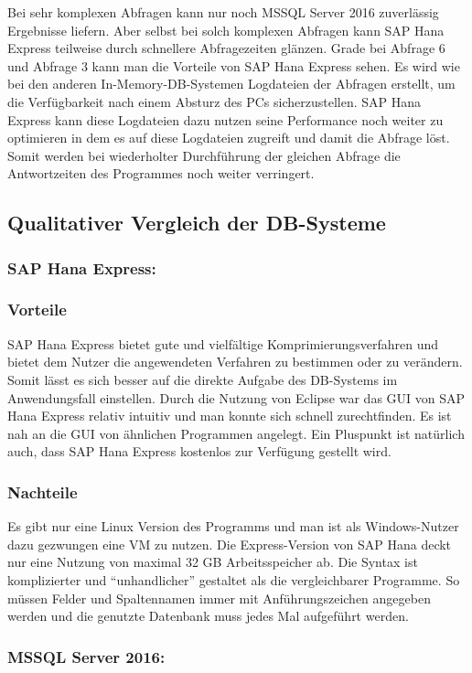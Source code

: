 \documentclass[a4paper, 12pt]{scrartcl}
\begin{document}
Bei sehr komplexen Abfragen kann nur noch MSSQL Server 2016 zuverlässig Ergebnisse liefern. Aber selbst bei solch komplexen Abfragen kann SAP Hana Express teilweise durch schnellere Abfragezeiten glänzen. 
Grade bei Abfrage 6 und Abfrage 3 kann man die Vorteile von SAP Hana Express sehen. Es wird wie bei den anderen In-Memory-DB-Systemen Logdateien der Abfragen erstellt, um die Verfügbarkeit nach einem Absturz des PCs sicherzustellen. SAP Hana Express kann diese Logdateien dazu nutzen seine Performance noch weiter zu optimieren in dem es auf diese Logdateien zugreift und damit die Abfrage löst. Somit werden bei wiederholter Durchführung der gleichen Abfrage die Antwortzeiten des Programmes noch weiter verringert.
\subsection{Qualitativer Vergleich der DB-Systeme}
\subsubsection{SAP Hana Express:}
\subsubsection{Vorteile}
SAP Hana Express bietet gute und vielfältige Komprimierungsverfahren und bietet dem Nutzer die angewendeten Verfahren zu bestimmen oder zu verändern. Somit lässt es sich besser auf die direkte Aufgabe des DB-Systems im Anwendungsfall einstellen.
Durch die Nutzung von Eclipse war das GUI von SAP Hana Express relativ intuitiv und man konnte sich schnell zurechtfinden. Es ist nah an die GUI von ähnlichen Programmen angelegt.
Ein Pluspunkt ist natürlich auch, dass SAP Hana Express kostenlos zur Verfügung gestellt wird.

\subsubsection{Nachteile}
Es gibt nur eine Linux Version des Programms und man ist als Windows-Nutzer dazu gezwungen eine VM zu nutzen.
Die Express-Version von SAP Hana deckt nur eine Nutzung von maximal 32 GB Arbeitsspeicher ab.
Die Syntax ist komplizierter und "`unhandlicher"' gestaltet als die vergleichbarer Programme. So müssen Felder und Spaltennamen immer mit Anführungszeichen angegeben werden und die genutzte Datenbank muss jedes Mal aufgeführt werden.

\subsubsection{MSSQL Server 2016:}
\end{document}
